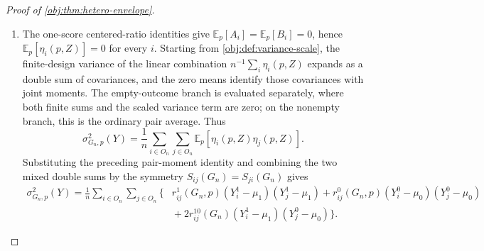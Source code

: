 \begin{proof}[Proof of \cref{obj:thm:hetero-envelope}]
\begin{enumerate}
\[\]
For the mixed moment, if \(S_{ij}(G_n)\neq\varnothing\), then a shared intervention is required to be both treated and untreated in \(T_i(Z)C_j(Z)\), so \(T_i(Z)C_j(Z)=0\) for every assignment and
\(\mathbb E_p[A_iB_j]=-1\).  If \(S_{ij}(G_n)=\varnothing\), the two exposure events use disjoint assignment coordinates, so
\(\mathbb E_p[T_i(Z)C_j(Z)]=\pi_i^1(p)\pi_j^0(p)\) and \(\mathbb E_p[A_iB_j]=0\).  Thus
\[
\mathbb E_p[A_iB_j]=-r_{ij}^{10}(G_n).
\]
The same argument with \(i\) and \(j\) exchanged, using \(S_{ij}(G_n)=S_{ji}(G_n)\), gives
\[
\mathbb E_p[B_iA_j]=-r_{ij}^{10}(G_n).
\]
Expanding the product of the two linearization summands,
\[
\begin{aligned}
\eta_i(p,Z)\eta_j(p,Z)
={}&A_iA_j(Y_i^1-\mu_1)(Y_j^1-\mu_1)
-A_iB_j(Y_i^1-\mu_1)(Y_j^0-\mu_0)\\
&{}-B_iA_j(Y_i^0-\mu_0)(Y_j^1-\mu_1)
+B_iB_j(Y_i^0-\mu_0)(Y_j^0-\mu_0),
\end{aligned}
\]
and inserting the four moment identities yields
\[
\begin{aligned}
\mathbb E_p\!\left[\eta_i(p,Z)\eta_j(p,Z)\right]
={}&
r_{ij}^1(G_n,p)(Y_i^1-\mu_1)(Y_j^1-\mu_1)
+r_{ij}^0(G_n,p)(Y_i^0-\mu_0)(Y_j^0-\mu_0)\\
&{}+r_{ij}^{10}(G_n)\!
\left\{(Y_i^1-\mu_1)(Y_j^0-\mu_0)+(Y_i^0-\mu_0)(Y_j^1-\mu_1)\right\}.
\end{aligned}
\]

\item The one-score centered-ratio identities give \(\mathbb E_p[A_i]=\mathbb E_p[B_i]=0\), hence \(\mathbb E_p[\eta_i(p,Z)]=0\) for every \(i\).  Starting from \cref{obj:def:variance-scale}, the finite-design variance of the linear combination \(n^{-1}\sum_i\eta_i(p,Z)\) expands as a double sum of covariances, and the zero means identify those covariances with joint moments.  The empty-outcome branch is evaluated separately, where both finite sums and the scaled variance term are zero; on the nonempty branch, this is the ordinary pair average.  Thus
\[
\sigma^2_{G_n,p}(Y)
=\frac1n\sum_{i\in O_n}\sum_{j\in O_n}
\mathbb E_p\!\left[\eta_i(p,Z)\eta_j(p,Z)\right].
\]
Substituting the preceding pair-moment identity and combining the two mixed double sums by the symmetry \(S_{ij}(G_n)=S_{ji}(G_n)\) gives
\[
\begin{aligned}
\sigma^2_{G_n,p}(Y)
=
\frac1n\sum_{i\in O_n}\sum_{j\in O_n}
\bigl\{&
r_{ij}^1(G_n,p)(Y_i^1-\mu_1)(Y_j^1-\mu_1)
+r_{ij}^0(G_n,p)(Y_i^0-\mu_0)(Y_j^0-\mu_0)\\
&{}+2r_{ij}^{10}(G_n)(Y_i^1-\mu_1)(Y_j^0-\mu_0)
\bigr\}.
\end{aligned}
\]


\end{enumerate}
\end{proof}
